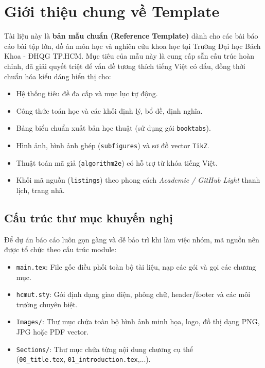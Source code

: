 \section{Giới thiệu chung về Template}

Tài liệu này là \textbf{bản mẫu chuẩn (Reference Template)} dành cho các bài báo cáo bài tập lớn, đồ án môn học và nghiên cứu khoa học tại Trường Đại học Bách Khoa - ĐHQG TP.HCM. Mục tiêu của mẫu này là cung cấp sẵn cấu trúc hoàn chỉnh, đã giải quyết triệt để vấn đề tương thích tiếng Việt có dấu, đồng thời chuẩn hóa kiểu dáng hiển thị cho:
\begin{itemize}
    \item Hệ thống tiêu đề đa cấp và mục lục tự động.
    \item Công thức toán học và các khối định lý, bổ đề, định nghĩa.
    \item Bảng biểu chuẩn xuất bản học thuật (sử dụng gói \texttt{booktabs}).
    \item Hình ảnh, hình ảnh ghép (\texttt{subfigures}) và sơ đồ vector \texttt{TikZ}.
    \item Thuật toán mã giả (\texttt{algorithm2e}) có hỗ trợ từ khóa tiếng Việt.
    \item Khối mã nguồn (\texttt{listings}) theo phong cách \textit{Academic / GitHub Light} thanh lịch, trang nhã.
\end{itemize}

\subsection{Cấu trúc thư mục khuyến nghị}
Để dự án báo cáo luôn gọn gàng và dễ bảo trì khi làm việc nhóm, mã nguồn nên được tổ chức theo cấu trúc module:
\begin{itemize}
    \item \texttt{main.tex}: File gốc điều phối toàn bộ tài liệu, nạp các gói và gọi các chương mục.
    \item \texttt{hcmut.sty}: Gói định dạng giao diện, phông chữ, header/footer và các môi trường chuyên biệt.
    \item \texttt{Images/}: Thư mục chứa toàn bộ hình ảnh minh họa, logo, đồ thị dạng PNG, JPG hoặc PDF vector.
    \item \texttt{Sections/}: Thư mục chứa từng nội dung chương cụ thể\\(\texttt{00\_title.tex}, \texttt{01\_introduction.tex},...).
\end{itemize}
